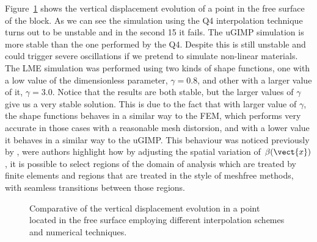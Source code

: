 Figure~\ref{fig:vertical-displacement-block} shows the vertical
displacement evolution of a point in the free surface of the block. As
we can see the simulation using the Q4 interpolation technique turns
out to be unstable and in the second 15 it fails. The uGIMP simulation
is more stable than the one performed by the Q4. Despite this is still
unstable and could trigger severe oscillations if we pretend to
simulate non-linear materials. The LME simulation was performed using
two kinds of shape functions, one with a low value of the
dimensionless parameter, $\gamma = 0.8$, and other with a larger value
of it, $\gamma = 3.0$. Notice that the results are both stable, but
the larger values of $\gamma$ give us a very stable solution. This is
due to the fact that with larger value of $\gamma$, the shape
functions behaves in a similar way to the FEM, which performs very
accurate in those cases with a reasonable mesh distorsion, and with a
lower value it behaves in a similar way to the uGIMP. This behaviour
was noticed previously by \cite{Arroyo2006}, were authors highlight
how by adjusting the spatial variation of $\beta(\vect{x})$, it is
possible to select regions of the domain of analysis which are treated
by finite elements and regions that are treated in the style of
meshfree methods, with seamless transitions between those regions. 
\begin{figure}\sidecaption
  \centering
  \caption{Comparative of the vertical displacement evolution in a
    point located in the free surface employing different
    interpolation schemes and numerical techniques.} 
  \label{fig:vertical-displacement-block}
\end{figure}


